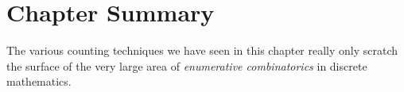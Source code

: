 \documentclass[12pt]{article}
\begin{document}
\section*{Chapter Summary}

The various counting techniques we have seen in this chapter really only scratch the surface of the very large area of \emph{enumerative combinatorics} in discrete mathematics.
\end{document}

